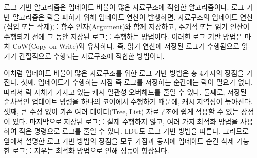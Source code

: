로그 기반 알고리즘은 업데이트 비율이 많은 자료구조에 적합한 알고리즘이다. 
로그 기반 알고리즘은 락을 피하기 위해 업데이트 연산이 발생하면, 자료구조의 업데이트 
연산(삽입 또는 삭제)를 함수 인자(Argument)와 함께 저장하고, 주기적 또는 읽기 연산이 
수행되기 전에 그 동안 저장된 로그를 수행하는 방법이다.
이러한 로그 기반 방법은 마치 CoW(Copy on Write)와 유사하다.
즉, 읽기 연산에 저장된 로그가 수행됨으로 읽기가 간헐적으로 수행되는 자료구조에 적합한 방법이다.

이처럼 업데이트 비율이 많은 자료구조를 위한 로그 기반 방법은 총 4가지의 장점을 가진다. 
첫째, 업데이트가 수행하는 시점 즉 로그를 저장하는 순간에는 락이 필요가 없다. 
따라서 락 자체가 가지고 있는 캐시 일관성 오버헤드를 줄일 수 있다. 
둘째로, 저장된 순차적인 업데이트 명령을 하나의 코어에서 수행하기 때문에, 캐시 지역성이 높아진다.
셋째, 큰 수정 없이 기존 여러 데이터(Tree, List) 자료구조에 쉽게 적용할 수 있는 장점이 있다.
마지막으로 저장된 로그를 실제 수행하지 않고, 여러 가지 최적화 방법을 사용하여 적은 
명령으로 로그를 줄일 수 있다. 
LDU도 로그 기반 방법을 따른다. 그러므로 앞에서 설명한 로그 기반 방법의 장점을 모두 가짐과 동시에
업데이트 순간 삭제 가능한 로그를 지우는 최적화 방법으로 인해 성능이 향상된다.

